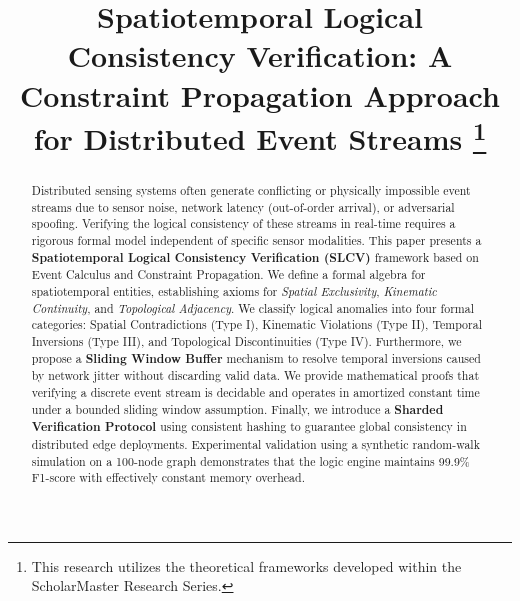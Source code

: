 \documentclass[conference]{IEEEtran}
\begin{document}
\title{Spatiotemporal Logical Consistency Verification: A Constraint Propagation Approach for Distributed Event Streams
\thanks{This research utilizes the theoretical frameworks developed within the ScholarMaster Research Series.}
}

\author{
}

\maketitle

\begin{abstract}
Distributed sensing systems often generate conflicting or physically impossible event streams due to sensor noise, network latency (out-of-order arrival), or adversarial spoofing. Verifying the logical consistency of these streams in real-time requires a rigorous formal model independent of specific sensor modalities. This paper presents a \textbf{Spatiotemporal Logical Consistency Verification (SLCV)} framework based on Event Calculus and Constraint Propagation. We define a formal algebra for spatiotemporal entities, establishing axioms for \textit{Spatial Exclusivity}, \textit{Kinematic Continuity}, and \textit{Topological Adjacency}. We classify logical anomalies into four formal categories: Spatial Contradictions (Type I), Kinematic Violations (Type II), Temporal Inversions (Type III), and Topological Discontinuities (Type IV). Furthermore, we propose a \textbf{Sliding Window Buffer} mechanism to resolve temporal inversions caused by network jitter without discarding valid data. We provide mathematical proofs that verifying a discrete event stream is decidable and operates in amortized constant time under a bounded sliding window assumption. Finally, we introduce a \textbf{Sharded Verification Protocol} using consistent hashing to guarantee global consistency in distributed edge deployments. Experimental validation using a synthetic random-walk simulation on a 100-node graph demonstrates that the logic engine maintains 99.9\% F1-score with effectively constant memory overhead.
\end{abstract}
\end{document}
